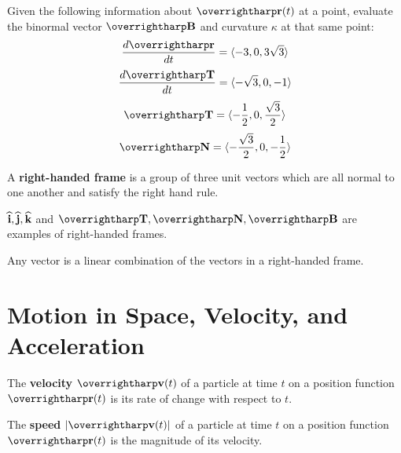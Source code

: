 \documentclass[letterpaper, twoside, 12pt]{book}
\begin{document}
          \begin{solution}

          \end{solution}

          \begin{problem}
          Given the following information about $\vect{r}(t)$ at a point,
          evaluate the binormal vector $\vect{B}$ and curvature
          $\kappa$ at that same point:
            \[\frac{d\vect{r}}{dt}=\<-3,0,3\sqrt{3}\>\]
            \[\frac{d\vect{T}}{dt}=\<-\sqrt{3},0,-1\>\]
            \[\vect{T}=\<-\frac{1}{2},0,\frac{\sqrt{3}}{2}\>\]
            \[\vect{N}=\<-\frac{\sqrt{3}}{2},0,-\frac{1}{2}\>\]
          \end{problem}

          \begin{solution}

          \end{solution}

\begin{definition}
  A \textbf{right-handed frame} is a group of three unit vectors which
  are all normal to one another and satisfy the right hand rule.
\end{definition}

\begin{example}
  $\mathbf{\widehat{i}},\mathbf{\widehat{j}},\mathbf{\widehat{k}}$ and $\vect T,\vect N,\vect B$ are examples
  of right-handed frames.
\end{example}

\begin{theorem}
  Any vector is a linear combination of the vectors in a right-handed frame.
\end{theorem}

\section{Motion in Space, Velocity, and Acceleration}

\begin{definition}
The \textbf{velocity} $\vect{v}(t)$ of a particle at time $t$ on a position
function $\vect{r}(t)$ is its rate of change with respect to $t$.
\end{definition}

\begin{definition}
The \textbf{speed} $|\vect{v}(t)|$ of a particle at time $t$ on a position
function $\vect{r}(t)$ is the magnitude of its velocity.
\end{definition}
\end{document}
